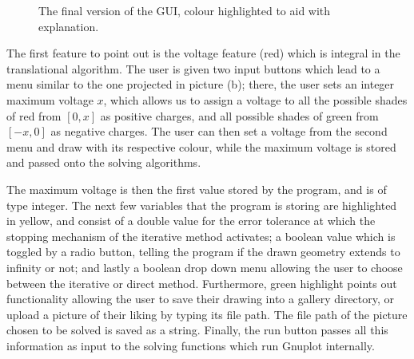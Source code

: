 \documentclass[a4paper]{article}
\begin{document}
\begin{figure}[!h]
  \centering
  \hfill
  \caption{The final version of the GUI, colour highlighted to aid with 
explanation.}
\end{figure}


The first feature to point out is the voltage feature (red) which is integral 
in the translational algorithm. The user is given two input buttons which lead 
to a menu similar to the one projected in picture (b); there, the user sets an 
integer maximum voltage $x$, which allows us to assign a voltage to all the 
possible shades of red from $[0,x]$ as positive charges, and all possible 
shades of green  from $[-x,0]$ as negative charges. The user can then set a 
voltage from the second menu and draw with its respective colour, while the 
maximum voltage is stored and passed onto the solving algorithms.

The maximum voltage is then the first value stored by the program, and is of 
type integer. The next few variables that the program is storing are 
highlighted in yellow, and consist of a double value for the error tolerance at 
which the stopping mechanism of the iterative method activates; a boolean value 
which is toggled by a radio button, telling the program if the drawn geometry 
extends to infinity or not; and lastly a boolean  drop down menu allowing the 
user to choose between the iterative or direct method. Furthermore, green 
highlight points out functionality allowing the user to save their drawing into 
a gallery directory, or upload a picture of their liking by typing its file 
path. The file path of the picture chosen to be solved is saved as a string. 
Finally, the run button passes all this information as input to the solving 
functions which run Gnuplot internally.
\end{document}
